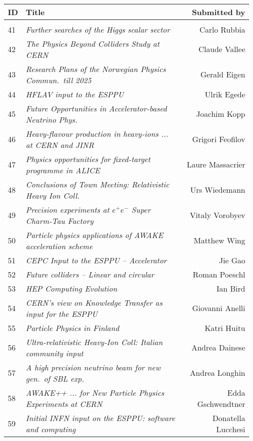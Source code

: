 \newpage
~\\ \vspace*{-8mm}
\begin{flushleft}
\begin{tabular}{llr} 
\bf ID & \bf Title & \bf Submitted by \\ \hline 
\vspace*{-3mm} & & \\
41 & \it Further searches of the Higgs scalar sector & Carlo Rubbia \\
42 & \it The Physics Beyond Colliders Study at CERN & Claude Vallee \\
43 & \it Research Plans of the Norwegian Physics Commun.\ till 2025 & Gerald Eigen \\
44 & \it HFLAV input to the ESPPU & Ulrik Egede \\
45 & \it Future Opportunities in Accelerator-based Neutrino Phys. & Joachim Kopp \\
46 & \it Heavy-flavour production in heavy-ions ... at CERN and JINR  & Grigori Feofilov \\
47 & \it Physics opportunities for fixed-target programme in ALICE & Laure Massacrier \\
48 & \it Conclusions of Town Meeting: Relativistic Heavy Ion Coll. & Urs Wiedemann \\
49 & \it Precision experiments at $e^+e^-$ Super Charm-Tau Factory & Vitaly Vorobyev \\
50 & \it Particle physics applications of AWAKE acceleration scheme & Matthew Wing \\
51 & \it CEPC Input to the ESPPU -- Accelerator & Jie Gao \\
52 & \it Future colliders -- Linear and circular & Roman Poeschl \\
53 & \it HEP Computing Evolution & Ian Bird \\
54 & \it CERN's view on Knowledge Transfer as input for the ESPPU & Giovanni Anelli \\
55 & \it Particle Physics in Finland & Katri Huitu \\
56 & \it Ultra-relativistic Heavy-Ion Coll: Italian community input & Andrea Dainese \\
57 & \it A high precision neutrino beam for new gen.\ of SBL exp. & Andrea Longhin \\
58 & \it AWAKE++ ... for New Particle Physics Experiments at CERN & Edda Gschwendtner \\
59 & \it Initial INFN input on the ESPPU: software and computing & Donatella Lucchesi \\

\end{tabular}
\end{flushleft}
